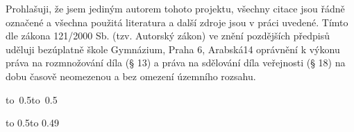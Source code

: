 \vspace{20mm}
\noindent Prohlašuji, že jsem jediným autorem tohoto projektu, všechny citace
jsou řádně označené a všechna použitá literatura a další zdroje jsou v práci
uvedené.  Tímto dle zákona 121/2000 Sb. (tzv. Autorský zákon) ve znění
pozdějších předpisů uděluji bezúplatně škole Gymnázium, Praha 6, Arabská14
oprávnění k výkonu práva na rozmnožování díla (§ 13) a práva na sdělování díla
veřejnosti (§ 18) na dobu časově neomezenou a bez omezení územního rozsahu.

\vspace{10mm}

\hbox{\hbox to 0.5\hbox to 0.5}

\vspace{20mm}

%
%
%

\newpage


\openright

\vbox to 0.5\nobreak\vbox to 0.49

\newpage

\openright
\pagestyle{plain}
\setcounter{page}{1}
